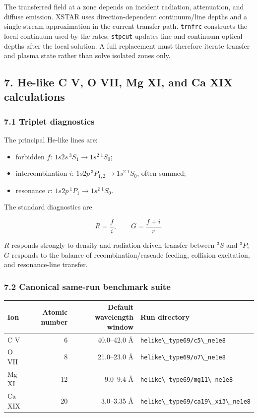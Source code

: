\documentclass[
  10pt,
]{article}
\newcommand{\passthrough}[1]{#1}
\providecommand{\tightlist}{%
  \setlength{\itemsep}{0pt}\setlength{\parskip}{0pt}}
\begin{document}
The transferred field at a zone depends on incident radiation,
attenuation, and diffuse emission. XSTAR uses direction-dependent
continuum/line depths and a single-stream approximation in the current
transfer path. \passthrough{\lstinline!trnfrc!} constructs the local
continuum used by the rates; \passthrough{\lstinline!stpcut!} updates
line and continuum optical depths after the local solution. A full
replacement must therefore iterate transfer and plasma state rather than
solve isolated zones only.

\subsection{7. He-like C V, O VII, Mg XI, and Ca XIX
calculations}\label{he-like-c-v-o-vii-mg-xi-and-ca-xix-calculations}

\subsubsection{7.1 Triplet diagnostics}\label{triplet-diagnostics}

The principal He-like lines are:

\begin{itemize}
\tightlist
\item
  forbidden \(f\): \(1s2s\,^3S_1\rightarrow1s^2\,^1S_0\);
\item
  intercombination \(i\): \(1s2p\,^3P_{{1,2}}\rightarrow1s^2\,^1S_0\),
  often summed;
\item
  resonance \(r\): \(1s2p\,^1P_1\rightarrow1s^2\,^1S_0\).
\end{itemize}

The standard diagnostics are

\[
R=\frac{{f}}{{i}},
\qquad
G=\frac{{f+i}}{{r}}.
\]

\(R\) responds strongly to density and radiation-driven transfer between
\(^3S\) and \(^3P\); \(G\) responds to the balance of
recombination/cascade feeding, collision excitation, and resonance-line
transfer.

\subsubsection{7.2 Canonical same-run benchmark
suite}\label{canonical-same-run-benchmark-suite}

\begin{longtable}[]{@{}lrrl@{}}
\toprule\noalign{}
Ion & Atomic number & Default wavelength window & Run directory \\
\midrule\noalign{}
\endhead
\bottomrule\noalign{}
\endlastfoot
C V & 6 & 40.0--42.0 Å &
\passthrough{\lstinline!helike\_type69/c5\_ne1e8!} \\
O VII & 8 & 21.0--23.0 Å &
\passthrough{\lstinline!helike\_type69/o7\_ne1e8!} \\
Mg XI & 12 & 9.0--9.4 Å &
\passthrough{\lstinline!helike\_type69/mg11\_ne1e8!} \\
Ca XIX & 20 & 3.0--3.35 Å &
\passthrough{\lstinline!helike\_type69/ca19\_xi3\_ne1e8!} \\
\end{longtable}
\end{document}
